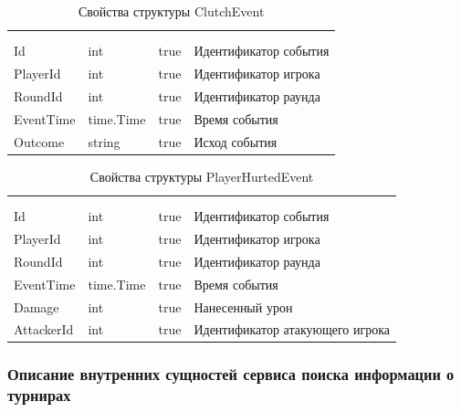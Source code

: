 \begin{xltabular}{\textwidth}{|X|X|X|X|}
	\caption{Свойства структуры ClutchEvent}\label{table:ClutchEvent}\\ \hline
	 &  &  &  \\ \hline
	 &  &  &  \\ \hline
	\endfirsthead
	 \hline
	 &  &  &  \\ \hline
	\endhead
	Id & int & true & Идентификатор события \\ \hline
	PlayerId & int & true & Идентификатор игрока \\ \hline
	RoundId & int & true & Идентификатор раунда \\ \hline
	EventTime & time.Time & true & Время события \\ \hline
	Outcome & string & true & Исход события \\ \hline
\end{xltabular}

\begin{xltabular}{\textwidth}{|X|X|X|X|}
	\caption{Свойства структуры PlayerHurtedEvent}\label{table:PlayerHurtedEvent}\\ \hline
	 &  &  &  \\ \hline
	 &  &  &  \\ \hline
	\endfirsthead
	 \hline
	 &  &  &  \\ \hline
	\endhead
	Id & int & true & Идентификатор события \\ \hline
	PlayerId & int & true & Идентификатор игрока \\ \hline
	RoundId & int & true & Идентификатор раунда \\ \hline
	EventTime & time.Time & true & Время события \\ \hline
	Damage & int & true & Нанесенный урон \\ \hline
	AttackerId & int & true & Идентификатор атакующего игрока \\ \hline
\end{xltabular}

\subsubsection{Описание внутренних сущностей сервиса поиска информации о турнирах}

